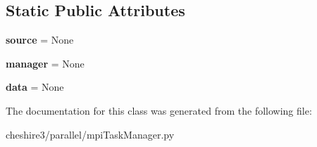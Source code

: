 \subsection*{Static Public Attributes}
\begin{DoxyCompactItemize}
\item 
\hypertarget{classcheshire3_1_1parallel_1_1mpi_task_manager_1_1_message_ad11699ccfaab322f00345ceadef7002b}{{\bfseries source} = None}\label{classcheshire3_1_1parallel_1_1mpi_task_manager_1_1_message_ad11699ccfaab322f00345ceadef7002b}

\item 
\hypertarget{classcheshire3_1_1parallel_1_1mpi_task_manager_1_1_message_aac8eded4c3ffb060838dc9e76d402aaf}{{\bfseries manager} = None}\label{classcheshire3_1_1parallel_1_1mpi_task_manager_1_1_message_aac8eded4c3ffb060838dc9e76d402aaf}

\item 
\hypertarget{classcheshire3_1_1parallel_1_1mpi_task_manager_1_1_message_ac5cab8074e8c8016b25857032361a042}{{\bfseries data} = None}\label{classcheshire3_1_1parallel_1_1mpi_task_manager_1_1_message_ac5cab8074e8c8016b25857032361a042}

\end{DoxyCompactItemize}


The documentation for this class was generated from the following file\-:\begin{DoxyCompactItemize}
\item 
cheshire3/parallel/mpi\-Task\-Manager.\-py\end{DoxyCompactItemize}
